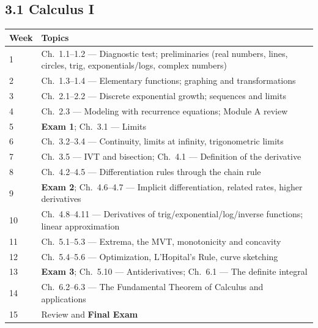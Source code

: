 \documentclass[11pt]{article}
\begin{document}
\subsection*{3.1 Calculus I}
\begin{longtable}{@{}p{}p{}@{}}
\toprule
\textbf{Week} & \textbf{Topics} \\
\midrule
\endhead
1 & Ch.\ 1.1--1.2 --- Diagnostic test; preliminaries (real numbers, lines, circles, trig, exponentials/logs, complex numbers) \\
2 & Ch.\ 1.3--1.4 --- Elementary functions; graphing and transformations \\
3 & Ch.\ 2.1--2.2 --- Discrete exponential growth; sequences and limits \\
4 & Ch.\ 2.3 --- Modeling with recurrence equations; Module A review \\
5 & \textbf{Exam 1}; Ch.\ 3.1 --- Limits \\
6 & Ch.\ 3.2--3.4 --- Continuity, limits at infinity, trigonometric limits \\
7 & Ch.\ 3.5 --- IVT and bisection; Ch.\ 4.1 --- Definition of the derivative \\
8 & Ch.\ 4.2--4.5 --- Differentiation rules through the chain rule \\
9 & \textbf{Exam 2}; Ch.\ 4.6--4.7 --- Implicit differentiation, related rates, higher derivatives \\
10 & Ch.\ 4.8--4.11 --- Derivatives of trig/exponential/log/inverse functions; linear approximation \\
11 & Ch.\ 5.1--5.3 --- Extrema, the MVT, monotonicity and concavity \\
12 & Ch.\ 5.4--5.6 --- Optimization, L'Hopital's Rule, curve sketching \\
13 & \textbf{Exam 3}; Ch.\ 5.10 --- Antiderivatives; Ch.\ 6.1 --- The definite integral \\
14 & Ch.\ 6.2--6.3 --- The Fundamental Theorem of Calculus and applications \\
15 & Review and \textbf{Final Exam} \\
\bottomrule
\end{longtable}
\end{document}
